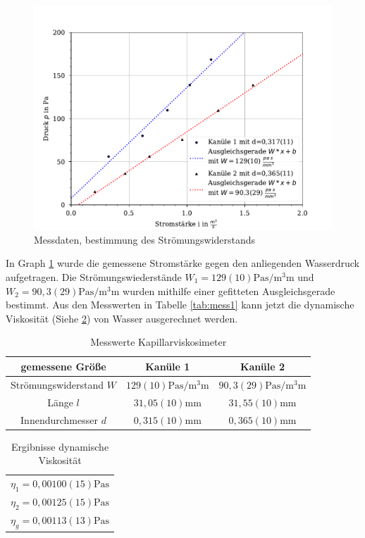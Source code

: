 \documentclass[11pt, a4paper]{article}
\begin{document}
    \begin{figure}
        \centering
        \includegraphics[width=\textwidth]{./1Plot.pdf}

        \caption{Messdaten, bestimmung des Strömungswiderstands}
        \label{fig:mess}
    \end{figure}
    In Graph \ref{fig:mess} wurde die gemessene Stromstärke gegen den anliegenden Wasserdruck aufgetragen.
    Die Strömungswiederstände $W_1 = 129(10) \si{\pascal\second\per\cubic\milli\metre}$ und 
    $W_2 = 90,3(29) \si{\pascal\second\per\cubic\milli\metre}$ wurden mithilfe einer gefitteten Ausgleichsgerade
    bestimmt. Aus den Messwerten in Tabelle \ref{tab:mess1} kann jetzt die dynamische Viskosität (Siehe \ref{tab:erg1}) von Wasser
    ausgerechnet werden.
    \begin{table}
        \centering
        \begin{tabular}{c c c}
            gemessene Größe & Kanüle 1 & Kanüle 2 \\ \hline
            Strömungswiderstand $W$ & $129(10) \si{\pascal\second\per\cubic\milli\metre}$ & $90,3(29) \si{\pascal\second\per\cubic\milli\metre}$ \\
            Länge $l$ & $31,05(10) \si{\milli\metre}$ & $31,55(10) \si{\milli\metre}$ \\
            Innendurchmesser $d$ & $0,315(10) \si{\milli\metre}$ & $0,365(10) \si{\milli\metre}$ \\
            
        \end{tabular}
        \caption{Messwerte Kapillarviskosimeter}
        \label{tab:mess2}
    \end{table}
    \begin{table}
        \centering
        \begin{tabular}{c}
            $\eta_1 = 0,00100(15) \si{\pascal \second}$ \\
            $\eta_2 = 0,00125(15) \si{\pascal \second} $ \\
            $\eta_g = 0,00113(13) \si{\pascal \second} $ \\
        \end{tabular}
        \caption{Ergibnisse dynamische Viskosität}
        \label{tab:erg1}
    \end{table}
\end{document}
